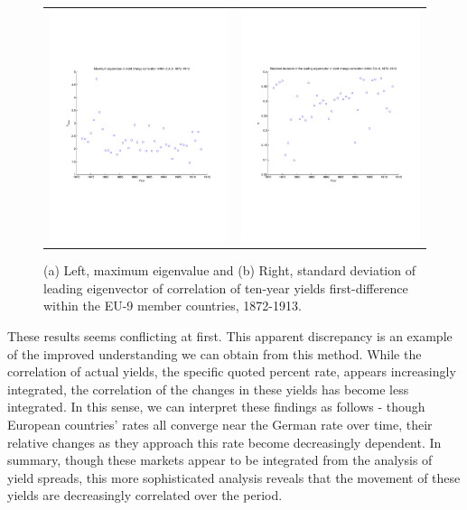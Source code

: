\documentclass[3p]{elsarticle}
\begin{document}
\begin{figure}[ht!]
	\centering
	\begin{tabular}{cc}
		\includegraphics[width=7cm]{fig_diff_maxeig_eu9} & 	\includegraphics[width=7cm]{fig_diff_maxeigstd_eu9}
	\end{tabular}
	\caption{(a) Left, maximum eigenvalue and (b) Right, standard deviation of leading eigenvector of correlation of ten-year yields first-difference within the EU-9 member countries, 1872-1913.}
	\label{fig:diff_maxeig_eu9}
\end{figure}

These results seems conflicting at first.  This apparent discrepancy is an example of the improved understanding we can obtain from this method.  While the correlation of actual yields, the specific quoted percent rate, appears increasingly integrated, the correlation of the changes in these yields has become less integrated.  In this sense, we can interpret these findings as follows - though European countries' rates all converge near the German rate over time, their relative changes as they approach this rate become decreasingly dependent.  In summary, though these markets appear to be integrated from the analysis of yield spreads, this more sophisticated analysis reveals that the movement of these yields are decreasingly correlated over the period.
\end{document}
